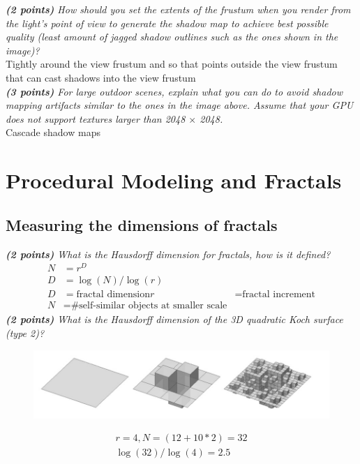 \documentclass[a4paper,10pt]{article}
\begin{document}
\textit{\textbf{(2 points)} How should you set the extents of the frustum when you render from the light's point of view to generate the shadow map to achieve best possible quality (least amount of jagged shadow outlines such as the ones shown in the image)?}\\

Tightly around the view frustum and so that points outside the view frustum that can cast shadows into the view frustum\\

\textit{\textbf{(3 points)} For large outdoor scenes, explain what you can do to avoid shadow mapping artifacts similar to the ones in the image above. Assume that your GPU does not support textures larger than 2048 $\times$ 2048.}\\

Cascade shadow maps
\section{Procedural Modeling and Fractals}
\subsection{Measuring the dimensions of fractals}
\textit{\textbf{(2 points)} What is the Hausdorff dimension for fractals, how is it defined?}
\[\begin{aligned}
N&=r^D\\
D&=\log(N)/\log(r)\\
D&=\text{fractal dimension}
r&=\text{fractal increment}\\
N&=\text{\# self-similar objects at smaller scale}
\end{aligned}\]
\textit{\textbf{(2 points)} What is the Hausdorff dimension of the 3D quadratic Koch surface (type 2)?}\\

\begin{figure}[H]
	\centering
	\includegraphics[width=.7\textwidth]{5-koch}
\end{figure}
\[\begin{aligned}
r=4,N=(12+10*2)=32\\
\log(32)/\log(4)=2.5
\end{aligned}\]
\end{document}
